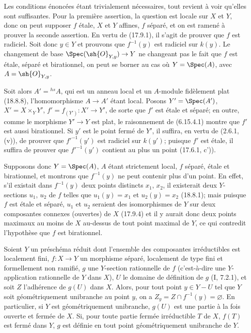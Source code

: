 Les conditions énoncées étant trivialement nécessaires, tout revient à voir qu'elles sont suffisantes. Pour la première assertion, la question est locale sur $X$ et $Y$, donc on peut supposer $f$ étale, $X$ et $Y$ affines, $f$ séparé, et on est ramené à prouver la seconde assertion. En vertu de (17.9.1), il s'agit de prouver que $f$ est radiciel. Soit donc $y\in Y$ et prouvons que $f^{-1}(y)$ est radiciel sur $k(y)$. Le changement de base $\Spec(\sh{O}_{Y,y})\to Y$ ne changeant pas le fait que $f$ est étale, séparé et birationnel, on peut se borner au cas où $Y=\Spec(A)$, avec $A=\sh{O}_{Y,y}$.


Soit alors $A'={}^{hs}\!A$, qui est un anneau local et un $A$-module fidèlement plat (18.8.8), l'homomorphisme $A\to A'$ étant local. Posons $Y'=\Spec(A')$, $X'=X\times_Y Y'$, $f'=f_{(Y')}:X'\to Y'$, de sorte que $f'$ est étale et séparé; en outre, comme le morphisme $Y'\to Y$ est plat, le raisonnement de (6.15.4.1) montre que $f'$ est aussi birationnel. Si $y'$ est le point fermé de $Y'$, il suffira, en vertu de (2.6.1, (v)), de prouver que $f'^{-1}(y')$ est radiciel sur $k(y')$; puisque $f'$ est étale, il suffira de prouver que $f'^{-1}(y')$ contient au plus un point (17.6.1, c')).

Supposons donc $Y=\Spec(A)$, $A$ étant strictement local, $f$ séparé, étale et birationnel, et montrons que $f^{-1}(y)$ ne peut contenir plus d'un point. En effet, s'il existait dans $f^{-1}(y)$ deux points distincts $x_1$, $x_2$, il existerait deux $Y$-sections $u_1$, $u_2$ de $f$ telles que $u_1(y)=x_1$ et $u_2(y)=x_2$ (18.8.1); mais puisque $f$ est étale et séparé, $u_1$ et $u_2$ seraient des isomorphismes de $Y$ sur deux composantes connexes (ouvertes) de $X$ (17.9.4) et il y aurait donc deux points maximaux au moins de $X$ au-dessus de tout point maximal de $Y$, ce qui contredit l'hypothèse que $f$ est birationnel.

\begin{proposition}[18.10.19]
\label{IV.18.10.19}
Soient $Y$ un préschéma réduit dont l'ensemble des composantes irréductibles est localement fini, $f:X\to Y$ un morphisme séparé, localement de type fini et formellement non ramifié, $g$ une $Y$-section rationnelle de $f$ (c'est-à-dire une $Y$-application rationnelle de $Y$ dans $X$), $U$ le domaine de définition de $g$ (I, 7.2.1), et soit $Z$ l'adhérence de $g(U)$ dans $X$. Alors, pour tout point $y\in Y-U$ tel que $Y$ soit géométriquement unibranche au point $y$, on a $Z_y=Z\cap f^{-1}(y)=\varnothing$. En particulier, si $Y$ est géométriquement unibranche, $g(U)$ est une partie à la fois ouverte et fermée de $X$. Si, pour toute partie fermée irréductible $T$ de $X$, $f(T)$ est fermé dans $Y$, $g$ est définie en tout point géométriquement unibranche de $Y$.
\end{proposition}

